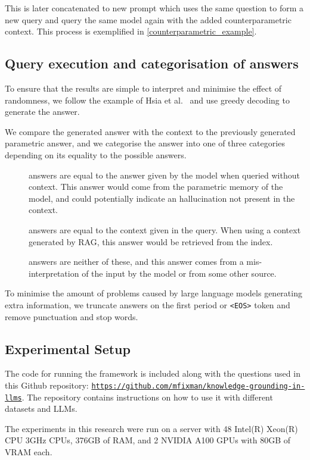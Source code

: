 This is later concatenated to new prompt which uses the same question to form a new query and query the same model again with the added counterparametric context.
This process is exemplified in \cref{counterparametric_example}.

\subsection{Query execution and categorisation of answers}

To ensure that the results are simple to interpret and minimise the effect of randomness, we follow the example of Hsia et al.~\cite{ragged} and use greedy decoding to generate the answer.

We compare the generated answer with the context to the previously generated parametric answer, and we categorise the answer into one of three categories depending on its equality to the possible answers.

\begin{description}
	\item[\Parametric{}] answers are equal to the answer given by the model when queried without context.
		This answer would come from the parametric memory of the model, and could potentially indicate an hallucination not present in the context.
	\item[\Contextual{}] answers are equal to the context given in the query.
		When using a context generated by RAG, this answer would be retrieved from the index.
	\item[\Other] answers are neither of these, and this answer comes from a mis-interpretation of the input by the model or from some other source.
\end{description}

To minimise the amount of problems caused by large language models generating extra information, we truncate answers on the first period or \texttt{<EOS>} token and remove punctuation and stop words.


\subsection{Experimental Setup}

The code for running the framework is included along with the questions used in this Github repository: \texttt{\url{https://github.com/mfixman/knowledge-grounding-in-llms}}.
The repository contains instructions on how to use it with different datasets and LLMs.

The experiments in this research were run on a server with 48 Intel(R) Xeon(R) CPU 3GHz CPUs, 376GB of RAM, and 2 NVIDIA A100 GPUs with 80GB of VRAM each. 
